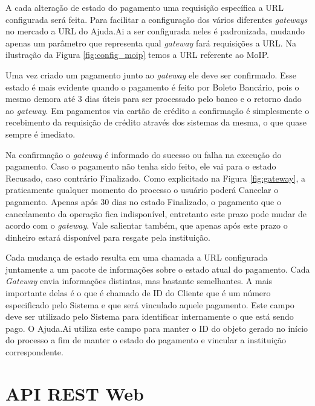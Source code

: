 A cada alteração de estado do pagamento uma requisição específica a URL configurada será feita. Para facilitar a configuração dos vários diferentes \emph{gateways} no mercado a URL do Ajuda.Ai a ser configurada neles é padronizada, mudando apenas um parâmetro que representa qual \emph{gateway} fará requisições a URL. Na ilustração da Figura \ref{fig:config_moip} temos a URL referente ao MoIP.

Uma vez criado um pagamento junto ao \emph{gateway} ele deve ser confirmado. Esse estado é mais evidente quando o pagamento é feito por Boleto Bancário, pois o mesmo demora até 3 dias úteis para ser processado pelo banco e o retorno dado ao \emph{gateway}. Em pagamentos via cartão de crédito a confirmação é simplesmente o recebimento da requisição de crédito através dos sistemas da mesma, o que quase sempre é imediato.

Na confirmação o \emph{gateway} é informado do sucesso ou falha na execução do pagamento. Caso o pagamento não tenha sido feito, ele vai para o estado Recusado, caso contrário Finalizado. Como explicitado na Figura \ref{fig:gateway}, a praticamente qualquer momento do processo o usuário poderá Cancelar o pagamento. Apenas após 30 dias no estado Finalizado, o pagamento que o cancelamento da operação fica indisponível, entretanto este prazo pode mudar de acordo com o \emph{gateway}. Vale salientar também, que apenas após este prazo o dinheiro estará disponível para resgate pela instituição.

Cada mudança de estado resulta em uma chamada a URL configurada juntamente a um pacote de informações sobre o estado atual do pagamento. Cada \emph{Gateway} envia informações distintas, mas bastante semelhantes. A mais importante delas é o que é chamado de ID do Cliente que é um número especificado pelo Sistema e que será vinculado aquele pagamento. Este campo deve ser utilizado pelo Sistema para identificar internamente o que está sendo pago. O Ajuda.Ai utiliza este campo para manter o ID do objeto  gerado no início do processo a fim de manter o estado do pagamento e vincular a instituição correspondente.





\section{API REST Web} \label{sec:ajudaai:api}


